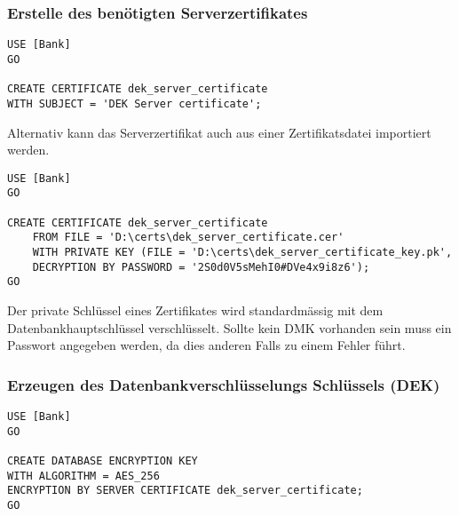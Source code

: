        \subsubsection{Erstelle des benötigten Serverzertifikates}
          \begin{lstlisting}[language=ms_sql,caption={Erstellen des
          Serverzertifikates},label=sql19_27]
USE [Bank]
GO

CREATE CERTIFICATE dek_server_certificate 
WITH SUBJECT = 'DEK Server certificate';  
          \end{lstlisting}
          Alternativ kann das Serverzertifikat auch aus einer Zertifikatsdatei
          importiert werden.
          \begin{lstlisting}[language=ms_sql,caption={Erstellen des Serverzertifikates aus einer Datei},label=sql19_28]
USE [Bank]
GO

CREATE CERTIFICATE dek_server_certificate  
    FROM FILE = 'D:\certs\dek_server_certificate.cer' 
    WITH PRIVATE KEY (FILE = 'D:\certs\dek_server_certificate_key.pk', 
    DECRYPTION BY PASSWORD = '2S0d0V5sMehI0#DVe4x9i8z6');
GO        \end{lstlisting}
          \begin{merke}
            Der private Schlüssel eines Zertifikates wird standardmässig mit dem
            Datenbankhauptschlüssel verschlüsselt. Sollte kein DMK vorhanden
            sein muss ein Passwort angegeben werden, da dies anderen Falls
            zu einem Fehler führt.
          \end{merke}
          \begin{literaturinternet}
            \item \cite{ms187798}
          \end{literaturinternet}
        \subsubsection{Erzeugen des Datenbankverschlüsselungs Schlüssels (DEK)}
          \begin{lstlisting}[language=ms_sql,caption={Erstellen des
          Datenbankverschlüsselungs Schlüssels},label=sql19_29]
USE [Bank]
GO

CREATE DATABASE ENCRYPTION KEY
WITH ALGORITHM = AES_256
ENCRYPTION BY SERVER CERTIFICATE dek_server_certificate;
GO
          \end{lstlisting}
          \begin{literaturinternet}
            \item \cite{bb677241}
          \end{literaturinternet}
